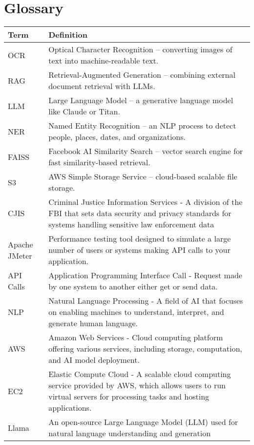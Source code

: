 \documentclass[11pt]{article}
\begin{document}
\section{Glossary}
\begin{longtable}{|l|p{10cm}|}
\hline
\textbf{Term} & \textbf{Definition} \\
\hline
OCR & Optical Character Recognition – converting images of text into machine-readable text. \\
RAG & Retrieval-Augmented Generation – combining external document retrieval with LLMs. \\
LLM & Large Language Model – a generative language model like Claude or Titan. \\
NER & Named Entity Recognition – an NLP process to detect people, places, dates, and organizations. \\
FAISS & Facebook AI Similarity Search – vector search engine for fast similarity-based retrieval. \\
S3 & AWS Simple Storage Service – cloud-based scalable file storage. \\


CJIS & Criminal Justice Information Services - A division of the FBI that sets data security and privacy standards for systems handling sensitive law enforcement data \\

Apache JMeter & Performance testing tool designed to simulate a large number of users or systems making API calls to your application. \\

API Calls & Application Programming Interface Call - Request made by one system to another either get or send data. \\ 

NLP & Natural Language Processing - A field of AI that focuses on enabling machines to understand, interpret, and generate human language. \\

AWS & Amazon Web Services - Cloud computing platform offering various services, including storage, computation, and AI model deployment. \\ 

EC2 & Elastic Compute Cloud - A scalable cloud computing service provided by AWS, which allows users to run virtual servers for processing tasks and hosting applications. \\ 

Llama & An open-source Large Language Model (LLM) used for natural language
understanding and generation \\ 


\end{longtable}
\end{document}
